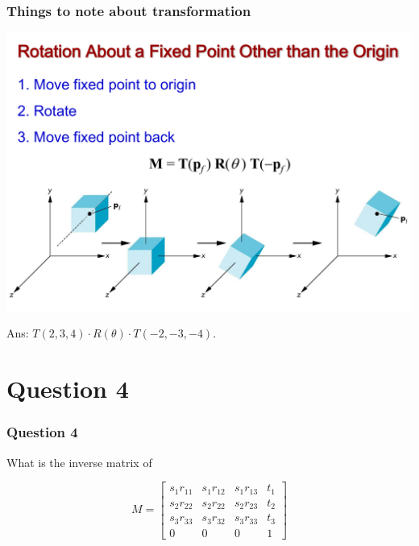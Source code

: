 \documentclass{beamer}
\begin{document}
\begin{frame}
    \frametitle{Things to note about transformation}


    \begin{center}
        \includegraphics[scale=0.3]{rotate-about-fixed-pt.png}
    \end{center}

    \begin{tcolorbox}
        Ans: $T(2,3,4) \cdot R(\theta) \cdot T(-2, -3, -4)$.
    \end{tcolorbox}

\end{frame}

\section{Question 4}

\begin{frame}
    \frametitle{Question 4}

    What is the inverse matrix of 

    \begin{center}
        $$ M = 
        \left[
        \begin{matrix}
            s_1 r_{11} & s_1 r_{12} & s_1 r_{13} & t_1\\
            s_2 r_{22} & s_2 r_{22} & s_2 r_{23} & t_2\\
            s_3 r_{33} & s_3 r_{32} & s_3 r_{33} & t_3\\
            0 & 0 & 0 & 1
        \end{matrix}
        \right]
        $$
        
    \end{center}

\end{frame}
\end{document}
